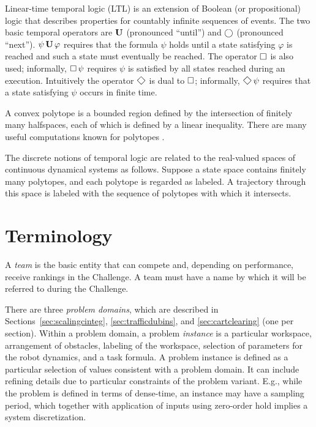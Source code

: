 \documentclass{amsart}
\theoremstyle{definition}
\begin{document}
Linear-time temporal logic (LTL) is an extension of Boolean (or propositional) logic
that describes properties for countably infinite sequences of events.  The two
basic temporal operators are $\operatorname{\mathbf{U}}$ (pronounced ``until'') and $\operatorname{\bigcirc}$
(pronounced ``next''). $\psi \operatorname{\mathbf{U}} \varphi$ requires that the formula $\psi$
holds until a state satisfying $\varphi$ is reached and such a state must
eventually be reached.  The operator $\operatorname{\Box}$ is also used; informally,
$\operatorname{\Box} \psi$ requires $\psi$ is satisfied by all states reached during an
execution.  Intuitively the operator $\Feventually$ is dual to $\operatorname{\Box}$;
informally, $\Feventually \psi$ requires that a state satisfying $\psi$ occurs
in finite time.

A convex polytope is a bounded region defined by the intersection of finitely
many halfspaces, each of which is defined by a linear inequality.  There are
many useful computations known for polytopes \cite{Fukuda2004}.

The discrete notions of temporal logic are related to the real-valued spaces of
continuous dynamical systems as follows.  Suppose a state space contains
finitely many polytopes, and each polytope is regarded as labeled.  A trajectory
through this space is labeled with the sequence of polytopes with which it
intersects.


\section{Terminology}

A \textit{team} is the basic entity that can compete and, depending on
performance, receive rankings in the Challenge.  A team must have a name by
which it will be referred to during the Challenge.

There are three \textit{problem domains}, which are described in
Sections~\ref{sec:scalingcinteg}, \ref{sec:trafficdubins}, and
\ref{sec:cartclearing} (one per section).  Within a problem domain, a problem
\textit{instance} is a particular workspace, arrangement of obstacles, labeling
of the workspace, selection of parameters for the robot dynamics, and a task
formula. A problem instance is defined as a particular selection of values
consistent with a problem domain. It can include refining details due to
particular constraints of the problem variant. E.g., while the problem is
defined in terms of dense-time, an instance may have a sampling period, which
together with application of inputs using zero-order hold implies a system
discretization.
\end{document}
